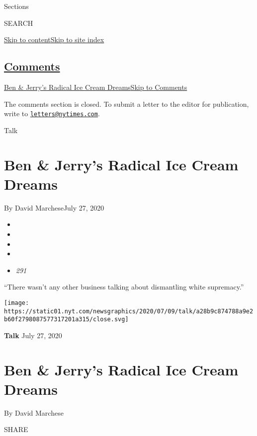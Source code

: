 Sections

SEARCH

\protect\hyperlink{site-content}{Skip to
content}\protect\hyperlink{site-index}{Skip to site index}

\hypertarget{comments}{%
\subsection{\texorpdfstring{\protect\hyperlink{commentsContainer}{Comments}}{Comments}}\label{comments}}

\href{}{Ben \& Jerry's Radical Ice Cream Dreams}\href{}{Skip to
Comments}

The comments section is closed. To submit a letter to the editor for
publication, write to
\href{mailto:letters@nytimes.com}{\nolinkurl{letters@nytimes.com}}.

Talk

\hypertarget{ben--jerrys-radical-ice-cream-dreams}{%
\section{Ben \& Jerry's Radical Ice Cream
Dreams}\label{ben--jerrys-radical-ice-cream-dreams}}

By David MarcheseJuly 27, 2020

\begin{itemize}
\item
\item
\item
\item
\item
  \emph{291}
\end{itemize}

``There wasn't any other business talking about dismantling white
supremacy.''

\texttt{[image: https://static01.nyt.com/newsgraphics/2020/07/09/talk/a28b9c874788a9e2b60f2798087577317201a315/close.svg]}

\textbf{Talk} July 27, 2020

\hypertarget{ben--jerrys-radical-ice-cream-dreams-1}{%
\section{Ben \& Jerry's Radical Ice Cream
Dreams}\label{ben--jerrys-radical-ice-cream-dreams-1}}

By David Marchese

SHARE

